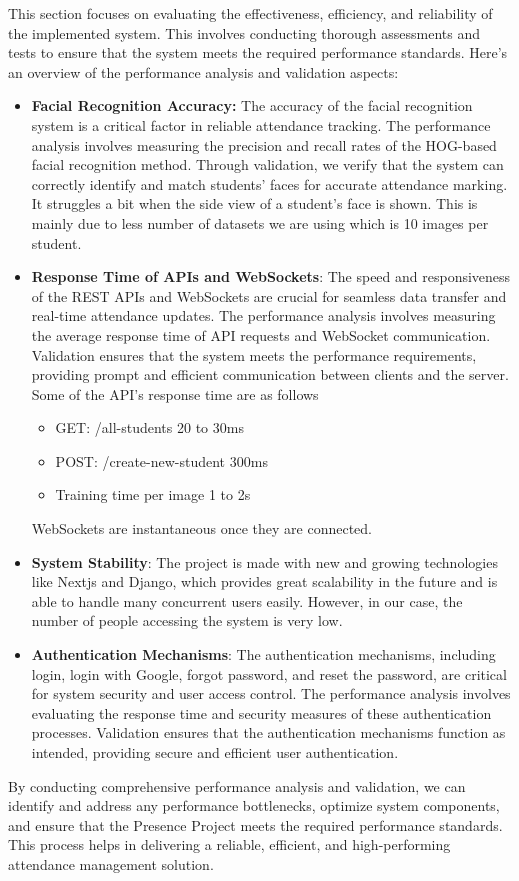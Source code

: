 This section focuses on evaluating the effectiveness, efficiency, and reliability of the implemented system. This involves conducting thorough assessments and tests to ensure that the system meets the required performance standards. Here's an overview of the performance analysis and validation aspects:

\begin{itemize}
\item \textbf{Facial Recognition Accuracy:} The accuracy of the facial recognition system is a critical factor in reliable attendance tracking. The performance analysis involves measuring the precision and recall rates of the HOG-based facial recognition method. Through validation, we verify that the system can correctly identify and match students' faces for accurate attendance marking. It struggles a bit when the side view of a student's face is shown. This is mainly due to less number of datasets we are using which is 10 images per student.

\item \textbf{Response Time of APIs and WebSockets}: The speed and responsiveness of the REST APIs and WebSockets are crucial for seamless data transfer and real-time attendance updates. The performance analysis involves measuring the average response time of API requests and WebSocket communication. Validation ensures that the system meets the performance requirements, providing prompt and efficient communication between clients and the server.
Some of the API's response time are as follows
\begin{itemize}
    \item GET: /all-students  20 to 30ms
    \item POST: /create-new-student 300ms
    \item Training time per image 1 to 2s
\end{itemize}
WebSockets are instantaneous once they are connected. 

\item \textbf{System Stability}: The project is made with new and growing technologies like Nextjs and Django, which provides great scalability in the future and is able to handle many concurrent users easily. However, in our case, the number of people accessing the system is very low.

\item \textbf{Authentication Mechanisms}: The authentication mechanisms, including login, login with Google, forgot password, and reset the password, are critical for system security and user access control. The performance analysis involves evaluating the response time and security measures of these authentication processes. Validation ensures that the authentication mechanisms function as intended, providing secure and efficient user authentication.
\end{itemize}

By conducting comprehensive performance analysis and validation, we can identify and address any performance bottlenecks, optimize system components, and ensure that the Presence Project meets the required performance standards. This process helps in delivering a reliable, efficient, and high-performing attendance management solution.